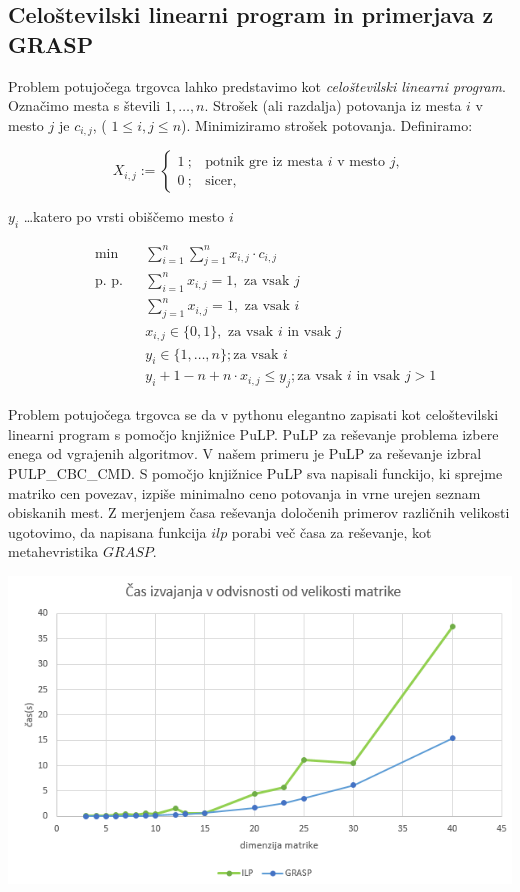\documentclass[12pt,a4paper]{amsart}
\theoremstyle{definition} %
\theoremstyle{plain} %
\begin{document}
\subsection{Celoštevilski linearni program in primerjava z GRASP}  \hfill \break


Problem potujočega trgovca lahko predstavimo kot \textit{celoštevilski linearni program}.
Označimo mesta s števili $1, \ldots, n$. Strošek (ali razdalja) potovanja iz mesta $i$ v mesto $j$ je $c_{i,j}$, ( $ 1\leq i, j\leq n$). Minimiziramo strošek potovanja. Definiramo:

$$ X_{i,j} := \left\{ \begin{array}{ll}
1 ~; & \textrm{potnik gre iz mesta $i$ v mesto $j$}, \\
0 ~; & \textrm{sicer},
\end{array} \right. $$

\hfill \break

$y_{i}$ \ldots katero po vrsti obiščemo mesto $i$


\begin{equation*}
\begin{aligned}
& {\text{min}}
& & \sum_{i=1}^{n} \sum_{j=1}^{n}  x_{i,j} \cdot c_{i,j} \\
& \text{p. p.}
& &\sum_{i=1}^{n} x_{i,j} = 1, \text{ za vsak $j$ }\\
&&&\sum_{j=1}^{n} x_{i,j} = 1, \text{ za vsak $i$ }\\
&&&  x_{i,j} \in \{0,1\}, \text{ za vsak $i$ in vsak $j$ }\\
&&& y_{i} \in \{1, \ldots, n\}; \text{za vsak $i$}\\
&&& y_{i} + 1 - n + n \cdot x_{i,j} \leq y_{j}; \text{za vsak $i$ in vsak $j>1$}
\end{aligned}
\end{equation*}

Problem potujočega trgovca se da v pythonu elegantno zapisati kot celoštevilski linearni program s pomočjo knjižnice PuLP. PuLP za reševanje problema izbere enega od vgrajenih algoritmov. V našem primeru je PuLP za reševanje izbral PULP\_CBC\_CMD. S pomočjo knjižnice PuLP sva napisali funckijo, ki sprejme matriko cen povezav, izpiše minimalno ceno potovanja in vrne urejen seznam obiskanih mest. 
Z merjenjem časa reševanja določenih primerov različnih velikosti ugotovimo, da napisana funkcija $ilp$ porabi več časa za reševanje, kot metahevristika $GRASP$. 

\includegraphics[scale =0.8]{casilp}
\end{document}

